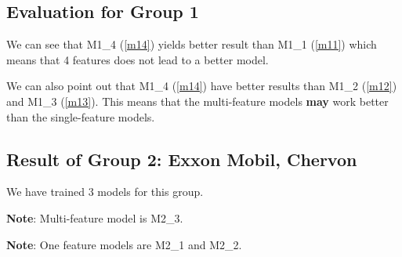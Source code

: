 \subsection{Evaluation for Group 1}
\label{sub:eval1} 

We can see that M1\_4 (\autoref{m14}) yields better result than M1\_1 (\autoref{m11}) which means
that 4 features does not lead to a better model.

We can also point out that M1\_4 (\autoref{m14}) have better results than
M1\_2 (\autoref{m12}) and M1\_3 (\autoref{m13}). This means that the multi-feature models
\textbf{may} work better than the single-feature models.

\subsection{Result of Group 2: Exxon Mobil, Chervon}
We have trained 3 models for this group.

\textbf{Note}: Multi-feature model is M2\_3.

\textbf{Note}: One feature models are M2\_1 and M2\_2.


